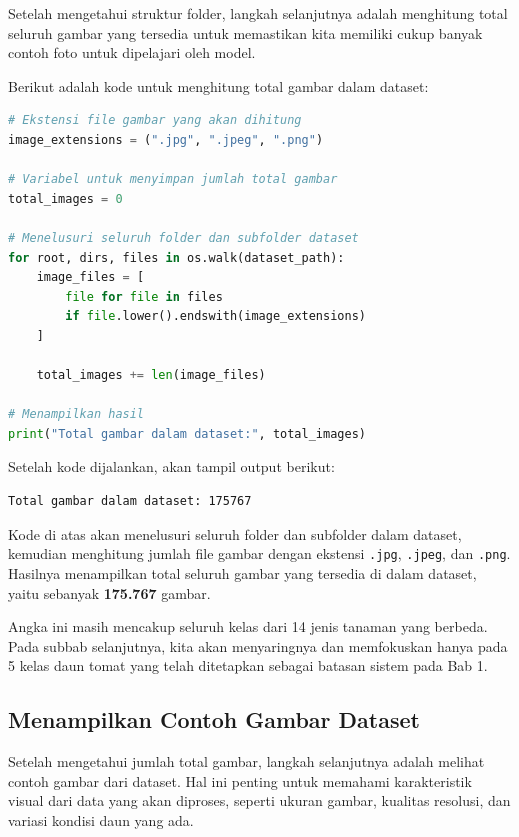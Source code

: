Setelah mengetahui struktur folder, langkah selanjutnya adalah menghitung total seluruh gambar yang tersedia untuk memastikan kita memiliki cukup banyak contoh foto untuk dipelajari oleh model.

Berikut adalah kode untuk menghitung total gambar dalam dataset:

\begin{lstlisting}[language=Python, caption=Menghitung total gambar dalam dataset]
# Ekstensi file gambar yang akan dihitung
image_extensions = (".jpg", ".jpeg", ".png")

# Variabel untuk menyimpan jumlah total gambar
total_images = 0

# Menelusuri seluruh folder dan subfolder dataset
for root, dirs, files in os.walk(dataset_path):
    image_files = [
        file for file in files
        if file.lower().endswith(image_extensions)
    ]

    total_images += len(image_files)

# Menampilkan hasil
print("Total gambar dalam dataset:", total_images)
\end{lstlisting}

Setelah kode dijalankan, akan tampil output berikut:

\begin{outputcode}[H]
\begin{lstlisting}[language={}]
Total gambar dalam dataset: 175767
\end{lstlisting}
\caption{Output total gambar dalam dataset}
\end{outputcode}

Kode di atas akan menelusuri seluruh folder dan subfolder dalam dataset, kemudian menghitung jumlah file gambar dengan ekstensi \texttt{.jpg}, \texttt{.jpeg}, dan \texttt{.png}. Hasilnya menampilkan total seluruh gambar yang tersedia di dalam dataset, yaitu sebanyak \textbf{175.767} gambar.

Angka ini masih mencakup seluruh kelas dari 14 jenis tanaman yang berbeda. Pada subbab selanjutnya, kita akan menyaringnya dan memfokuskan hanya pada 5 kelas daun tomat yang telah ditetapkan sebagai batasan sistem pada Bab 1.

\subsection{Menampilkan Contoh Gambar Dataset}

Setelah mengetahui jumlah total gambar, langkah selanjutnya adalah melihat contoh gambar dari dataset. Hal ini penting untuk memahami karakteristik visual dari data yang akan diproses, seperti ukuran gambar, kualitas resolusi, dan variasi kondisi daun yang ada.

